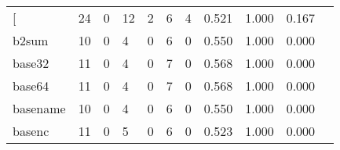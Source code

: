 \begin{longtable}{lp{1.2cm}p{1.2cm}p{1.2cm}p{1.2cm}p{1.2cm}p{1.2cm}p{1.2cm}p{1.2cm}p{1.2cm}p{1.2cm}}
\bottomrule
\endlastfoot
{[}         &                                    24 &                                                  0 &                                                 12 &                                                  2 &                                                  6 &                                                  4 &                                         0.521 &                                              1.000 &                                              0.167 \\
b2sum     &                                    10 &                                                  0 &                                                  4 &                                                  0 &                                                  6 &                                                  0 &                                         0.550 &                                              1.000 &                                              0.000 \\
base32    &                                    11 &                                                  0 &                                                  4 &                                                  0 &                                                  7 &                                                  0 &                                         0.568 &                                              1.000 &                                              0.000 \\
base64    &                                    11 &                                                  0 &                                                  4 &                                                  0 &                                                  7 &                                                  0 &                                         0.568 &                                              1.000 &                                              0.000 \\
basename  &                                    10 &                                                  0 &                                                  4 &                                                  0 &                                                  6 &                                                  0 &                                         0.550 &                                              1.000 &                                              0.000 \\
basenc    &                                    11 &                                                  0 &                                                  5 &                                                  0 &                                                  6 &                                                  0 &                                         0.523 &                                              1.000 &                                              0.000 \\

\end{longtable}
